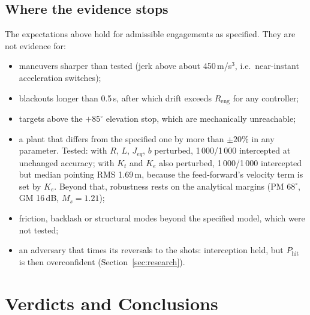 \documentclass[11pt,a4paper]{article}
\newcommand{\Reng}{R_{\mathrm{eng}}}
\newcommand{\Phit}{P_{\mathrm{hit}}}
\begin{document}
\subsection{Where the evidence stops}
The expectations above hold for admissible engagements as specified. They are not evidence for:
\begin{itemize}
\item maneuvers sharper than tested (jerk above about 450\,m/s$^3$, i.e.\ near-instant acceleration switches);
\item blackouts longer than 0.5\,s, after which drift exceeds $\Reng$ for any controller;
\item targets above the $+85^\circ$ elevation stop, which are mechanically unreachable;
\item a plant that differs from the specified one by more than $\pm20\%$ in any parameter. Tested: with $R$, $L$, $J_{eq}$, $b$ perturbed, 1\,000/1\,000 intercepted at unchanged accuracy; with $K_t$ and $K_e$ also perturbed, 1\,000/1\,000 intercepted but median pointing RMS 1.69\,m, because the feed-forward's velocity term is set by $K_e$. Beyond that, robustness rests on the analytical margins (PM $68^\circ$, GM 16\,dB, $M_s=1.21$);
\item friction, backlash or structural modes beyond the specified model, which were not tested;
\item an adversary that times its reversals to the shots: interception held, but $\Phit$ is then overconfident (Section~\ref{sec:research}).
\end{itemize}

\section{Verdicts and Conclusions}
\label{sec:verdict}
\end{document}
